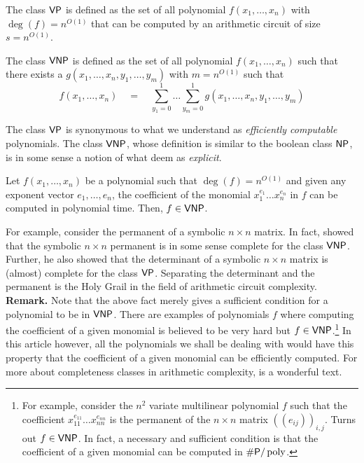 \begin{definition}
The class $\mathsf{VP}$ is defined as the set of all polynomial $f(x_1,\dots, x_n)$ with $\deg(f) = n^{O(1)}$ that can be computed by an arithmetic circuit of size $s = n^{O(1)}$. 

The class $\mathsf{VNP}$ is defined as the set of all polynomial $f(x_1,\dots, x_n)$ such that there exists a $g(x_1,\dots, x_n, y_1,\dots, y_m)$ with $m = n^{O(1)}$ such that
\[
f(x_1,\dots, x_n) \quad = \quad \sum_{y_1=0}^1\dots \sum_{y_m=0}^1 g(x_1,\dots, x_n, y_1,\dots, y_m)
\]
\end{definition}
The class $\mathsf{VP}$ is synonymous to what we understand as \emph{efficiently computable} polynomials. 
The class $\mathsf{VNP}$, whose definition is similar to the boolean class $\mathsf{NP}$, is in some sense a notion of what deem as \emph{explicit}. 

\begin{fact}
Let $f(x_1,\dots, x_n)$ be a polynomial such that $\deg(f) = n^{O(1)}$ and given any exponent vector $e_1,\dots, e_n$, the coefficient of the monomial $x_1^{e_1}\dots x_n^{e_n}$ in $f$ can be computed in polynomial time. 
Then, $f \in \mathsf{VNP}$. 
\end{fact}

For example, consider the permanent of a symbolic $n\times n$ matrix. 
In fact, \cite{v79} showed that the symbolic $n\times n$ permanent is in some sense complete for the class $\mathsf{VNP}$. 
Further, he also showed that the determinant of a symbolic  $n\times n$ matrix is (almost) complete for the class $\mathsf{VP}$. 
Separating the determinant and the permanent is the Holy Grail in the field of arithmetic circuit complexity. \\

{\bf Remark.} Note that the above fact merely gives a sufficient condition for a polynomial to be in $\mathsf{VNP}$. 
There are examples of polynomials $f$ where computing the coefficient of a given monomial is believed to be very hard but $f\in \mathsf{VNP}$.\footnote{For example, consider the $n^2$ variate multilinear polynomial $f$ such that the coefficient $x_{11}^{e_{11}}\dots x_{nn}^{e_{nn}}$ is the permanent of the $n\times n$ matrix $(\!(e_{ij})\!)_{i,j}$. 
Turns out $f \in \mathsf{VNP}$. 
In fact, a necessary and sufficient condition is that the coefficient of a given monomial can be computed in $\#\mathsf{P}/\operatorname{poly}$. }  In this article however, all the polynomials we shall be dealing with would have this property that the coefficient of a given monomial can be efficiently computed. 
For more about completeness classes in arithmetic complexity, \cite{bcs97} is a wonderful text. 


